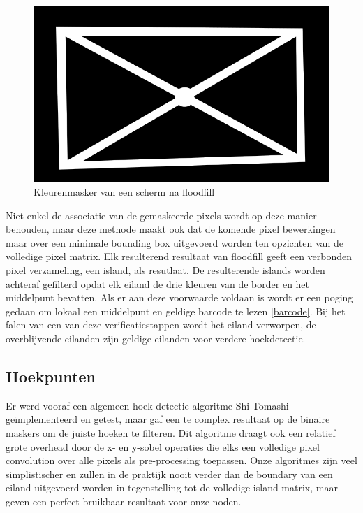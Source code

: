 \begin{figure}[h]
\centering
\includegraphics[scale=0.5]{img/mask.png}
\caption{Kleurenmasker van een scherm na floodfill}
\end{figure}

Niet enkel de associatie van de gemaskeerde pixels wordt op deze manier behouden, maar deze methode maakt ook dat de komende pixel bewerkingen maar over een minimale bounding box uitgevoerd worden ten opzichten van de volledige pixel matrix. Elk resulterend resultaat van floodfill geeft een verbonden pixel verzameling, een island, als resutlaat. De resulterende islands worden achteraf gefilterd opdat elk eiland de drie kleuren van de border en het middelpunt bevatten. Als er aan deze voorwaarde voldaan is wordt er een poging gedaan om lokaal een middelpunt en geldige barcode te lezen \ref{barcode}. Bij het falen van een van deze verificatiestappen wordt het eiland verworpen, de overblijvende eilanden zijn geldige eilanden voor verdere hoekdetectie.

\subsection{Hoekpunten}
Er werd vooraf een algemeen hoek-detectie algoritme Shi-Tomashi \cite{shi-tomashi} geïmplementeerd en getest, maar gaf een te complex resultaat op de binaire maskers om de juiste hoeken te filteren. Dit algoritme draagt ook een relatief grote overhead door de x- en y-sobel operaties die elks een volledige pixel convolution over alle pixels als pre-processing toepassen. Onze algoritmes zijn veel simplistischer en zullen in de praktijk nooit verder dan de boundary van een eiland uitgevoerd worden in tegenstelling tot de volledige island matrix, maar geven een perfect bruikbaar resultaat voor onze noden.

